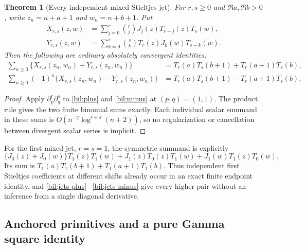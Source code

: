 \documentclass[11pt]{article}
\newtheorem{theorem}{Theorem}[section]
\theoremstyle{definition}
\theoremstyle{remark}
\numberwithin{equation}{section}
\begin{document}
\begin{theorem}[Every independent mixed Stieltjes jet]
\label{bil:stieltjes-all}
For $r,s\ge0$ and $\Re a,\Re b>0$, write $z_n=n+a+1$ and
$w_n=n+b+1$. Put
\begin{align*}
 X_{r,s}(z,w)&=\sum_{j=0}^{r}\binom rj
                         J_j(z)T_{r-j}(z)T_s(w),\\
 Y_{r,s}(z,w)&=\sum_{k=0}^{s}\binom sk
                         T_r(z)J_k(w)T_{s-k}(w).
\end{align*}
Then the following are ordinary absolutely convergent identities:
\begin{align}
 \sum_{n\ge0}\{X_{r,s}(z_n,w_n)+Y_{r,s}(z_n,w_n)\}
 &=T_r(a)T_s(b+1)+T_r(a+1)T_s(b),\label{bil:jets-plus}\\
 \sum_{n\ge0}(-1)^n\{X_{r,s}(z_n,w_n)-Y_{r,s}(z_n,w_n)\}
 &=T_r(a)T_s(b+1)-T_r(a+1)T_s(b).\label{bil:jets-minus}
\end{align}
\end{theorem}
\begin{proof}
Apply $\partial_p^r\partial_q^s$ to \eqref{bil:plus} and
\eqref{bil:minus} at $(p,q)=(1,1)$. The product rule gives the two
finite binomial sums exactly. Each individual scalar summand in these
sums is $O(n^{-2}\log^{r+s}(n+2))$, so no regularization or
cancellation between divergent scalar series is implicit.
\end{proof}

For the first mixed jet, $r=s=1$, the symmetric summand is explicitly
\[
 \{J_0(z)+J_0(w)\}T_1(z)T_1(w)
 +J_1(z)T_0(z)T_1(w)+J_1(w)T_1(z)T_0(w).
\]
Its sum is $T_1(a)T_1(b+1)+T_1(a+1)T_1(b)$. Thus independent
first Stieltjes coefficients at different shifts already occur in
an exact finite endpoint identity, and \eqref{bil:jets-plus}--
\eqref{bil:jets-minus} give every higher pair without an inference
from a single diagonal derivative.

\subsection{Anchored primitives and a pure Gamma square identity}
\end{document}
